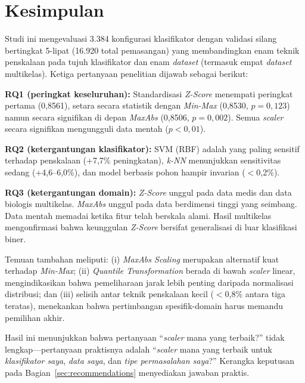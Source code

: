 \documentclass[12pt,a4paper]{article}
\begin{document}
\section{Kesimpulan}
\label{sec:conclusion}

Studi ini mengevaluasi 3.384 konfigurasi klasifikator dengan validasi silang
bertingkat 5-lipat (16.920 total pemasangan) yang membandingkan enam teknik
penskalaan pada tujuh klasifikator dan enam \textit{dataset} (termasuk empat
\textit{dataset} multikelas). Ketiga pertanyaan penelitian dijawab sebagai
berikut:

\textbf{RQ1 (peringkat keseluruhan):} Standardisasi \textit{Z-Score} menempati
peringkat pertama (0,8561), setara secara statistik dengan \textit{Min-Max}
(0,8530, $p=0,123$) namun secara signifikan di depan \textit{MaxAbs} (0,8506,
$p=0,002$). Semua \textit{scaler} secara signifikan mengungguli data mentah
($p<0,01$).

\textbf{RQ2 (ketergantungan klasifikator):} SVM (RBF) adalah yang paling sensitif
terhadap penskalaan (+7,7\% peningkatan), \textit{k-NN} menunjukkan sensitivitas
sedang (+4,6--6,0\%), dan model berbasis pohon hampir invarian ($<$0,2\%).

\textbf{RQ3 (ketergantungan domain):} \textit{Z-Score} unggul pada data medis dan
data biologis multikelas. \textit{MaxAbs} unggul pada data berdimensi tinggi
yang seimbang. Data mentah memadai ketika fitur telah berskala alami. Hasil
multikelas mengonfirmasi bahwa keunggulan \textit{Z-Score} bersifat generalisasi
di luar klasifikasi biner.

Temuan tambahan meliputi: (i) \textit{MaxAbs Scaling} merupakan alternatif kuat
terhadap \textit{Min-Max}; (ii) \textit{Quantile Transformation} berada di bawah
\textit{scaler} linear, mengindikasikan bahwa pemeliharaan jarak lebih penting
daripada normalisasi distribusi; dan (iii) selisih antar teknik penskalaan kecil
($<$0,8\% antara tiga teratas), menekankan bahwa pertimbangan spesifik-domain
harus memandu pemilihan akhir.

Hasil ini menunjukkan bahwa pertanyaan ``\textit{scaler} mana yang terbaik?''
tidak lengkap---pertanyaan praktisnya adalah ``\textit{scaler} mana yang terbaik
untuk \emph{klasifikator saya}, \emph{data saya}, dan \emph{tipe permasalahan
saya}?'' Kerangka keputusan pada Bagian~\ref{sec:recommendations} menyediakan
jawaban praktis.


\label{sec:references}
\end{document}
